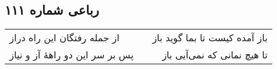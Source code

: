 \begin{center}
\section*{رباعی شماره ۱۱۱}
\label{sec:sh111}
\begin{longtable}{l p{0.5cm} r}
از جمله رفتگان این راه دراز
&&
باز آمده کیست تا بما گوید باز
\\
پس بر سر این دو راههٔ آز و نیاز
&&
تا هیچ نمانی که نمی‌آیی باز
\\
\end{longtable}
\end{center}
